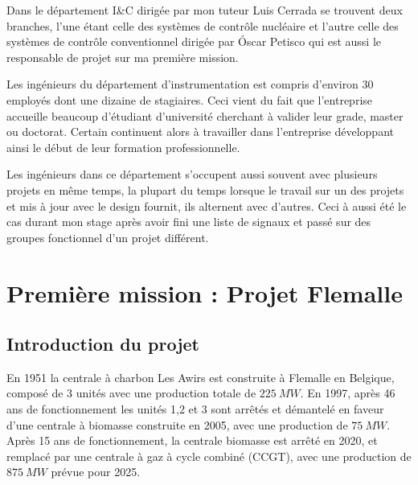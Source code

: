 \documentclass[11pt, openright]{book}
\begin{document}
Dans le département I\&C dirigée par mon tuteur Luis Cerrada se trouvent deux branches, l'une étant celle des systèmes de contrôle nucléaire et l'autre celle des systèmes de contrôle conventionnel dirigée par Óscar Petisco qui est aussi le responsable de projet sur ma première mission.

Les ingénieurs du département d'instrumentation est compris d'environ 30 employés dont une dizaine de stagiaires. Ceci vient du fait que l'entreprise accueille beaucoup d'étudiant d'univer\-sité cherchant à valider leur grade, master ou doctorat. Certain continuent alors à travailler dans l'entreprise développant ainsi le début de leur formation professionnelle.

Les ingénieurs dans ce département s'occupent aussi souvent avec plusieurs projets en même temps, la plupart du temps lorsque le travail sur un des projets et mis à jour avec le design fournit, ils alternent avec d'autres. Ceci à aussi été le cas durant mon stage après avoir fini une liste de signaux et passé sur des groupes fonctionnel d'un projet différent.















\newpage

\section{Première mission : Projet Flemalle}

\subsection{Introduction du projet}

En 1951 la centrale à charbon Les Awirs est construite à Flemalle en Belgique, composé de 3 unités avec une production totale de $225\ MW$.\cite{Hist Flemalle} En 1997, après 46 ans de fonctionnement les unités 1,2 et 3 sont arrêtés et démantelé en faveur d'une centrale à biomasse construite en 2005, avec une production de $75\ MW$.\cite{Hist Flemalle2}\cite{Hist Flemalle3} Après 15 ans de fonctionnement, la centrale biomasse est arrêté en 2020, et remplacé par une centrale à gaz à cycle combiné (CCGT), avec une production de $875\ MW$ prévue pour 2025.\cite{Hist Flemalle3}\cite{Hist Flemalle4}
\end{document}
